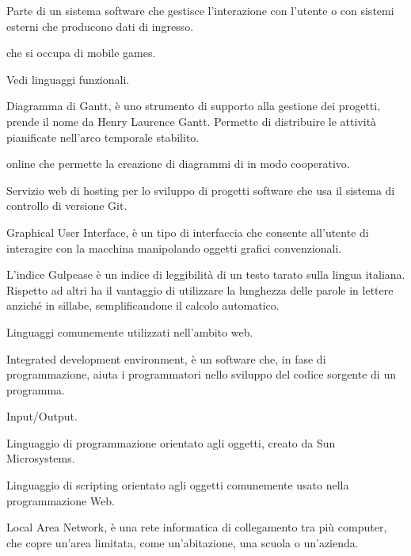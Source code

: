 Parte di un sistema software che gestisce l'interazione con l'utente o con sistemi esterni che producono dati di ingresso.

 che si occupa di mobile games.

Vedi linguaggi funzionali.


Diagramma di Gantt, è uno strumento di supporto alla gestione dei progetti, prende il nome da Henry Laurence Gantt.
Permette di distribuire le attività pianificate nell'arco temporale stabilito.

 online che permette la creazione di diagrammi di  in modo cooperativo.

Servizio web di hosting per lo sviluppo di progetti software che usa il sistema di controllo di versione Git.

Graphical User Interface, è un tipo di interfaccia che consente all'utente di interagire con la macchina manipolando oggetti grafici convenzionali.

L'indice Gulpease è un indice di leggibilità di un testo tarato sulla lingua italiana. Rispetto ad altri ha il vantaggio di utilizzare la lunghezza delle parole in lettere anziché in sillabe, semplificandone il calcolo automatico.


Linguaggi comunemente utilizzati nell'ambito web.


Integrated development environment,  è un software che, in fase di programmazione, aiuta i programmatori nello sviluppo del codice sorgente di un programma.

Input/Output.


Linguaggio di programmazione orientato agli oggetti, creato da Sun Microsystems.

Linguaggio di scripting orientato agli oggetti comunemente usato nella programmazione Web.


Local Area Network, è una rete informatica di collegamento tra più computer, che copre un'area limitata, come un'abitazione, una scuola o un'azienda.

